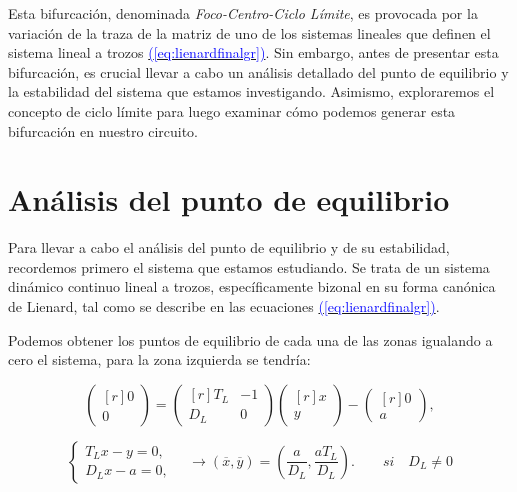 \documentclass[12pt,a4paper]{report} %
\newcommand{\eref}[1]{\hyperref[#1]{\textcolor{blue}{(\ref*{#1})}}}
\newcommand{\eref}[1]{\hyperref[#1]{\textcolor{blue}{\textit{(\ref*{#1})}}}}
\begin{document}
	\vspace{0.5cm}\noindent Esta bifurcación, denominada \textit{Foco-Centro-Ciclo Límite}, es provocada por la variación de la traza de la matriz de uno de los sistemas lineales que definen el sistema lineal a trozos \eref{eq:lienardfinalgr}. Sin embargo, antes de presentar esta bifurcación, es crucial llevar a cabo un análisis detallado del punto de equilibrio y la estabilidad del sistema que estamos investigando. Asimismo, exploraremos el concepto de ciclo límite para luego examinar cómo podemos generar esta bifurcación en nuestro circuito.
	
	\section{Análisis del punto de equilibrio}
	\label{sec:41}
	
		Para llevar a cabo el análisis del punto de equilibrio y de su estabilidad, recordemos primero el sistema que estamos estudiando. Se trata de un sistema dinámico continuo lineal a trozos, específicamente bizonal en su forma canónica de Lienard, tal como se describe en las ecuaciones \eref{eq:lienardfinalgr}.
		
		\vspace{0.5cm}Podemos obtener los puntos de equilibrio de cada una de las zonas igualando a cero el sistema, para la zona izquierda se tendría:

		
		\begin{equation*}
			\begin{pmatrix*}[r]
				0\\ 0
			\end{pmatrix*}= \begin{pmatrix*}[r]
				T_L & -1 \\ D_L & 0
			\end{pmatrix*} \begin{pmatrix*}[r]
				x \\ y
			\end{pmatrix*}-\begin{pmatrix*}[r]
				0 \\ a
			\end{pmatrix*},
		\end{equation*}\smallskip
		
		\begin{equation}
			\label{eq:eqpointL}
			\left\{
			\begin{aligned}
				T_Lx-y=0,\\
				D_Lx-a=0,
			\end{aligned}
			\right. \quad \longrightarrow \left( \overline{x},\overline{y} \right)=\left( \frac{a}{D_L},\frac{aT_L}{D_L} \right). \qquad si \quad D_L\neq0
		\end{equation}\smallskip
		
\end{document}
